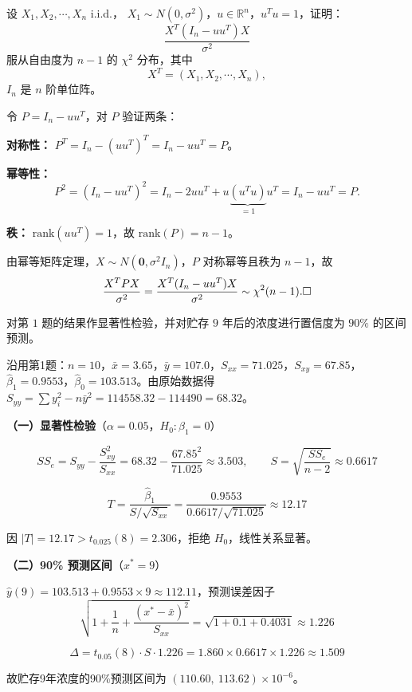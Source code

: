 \begin{homework}[5.2.2]
设 $X_1, X_2, \cdots, X_n$ i.i.d.，
$X_1 \sim N(0,\sigma^2)$，$u \in \mathbb{R}^n$，$u^T u = 1$，证明：
\[
\frac{X^T(I_n - uu^T)X}{\sigma^2}
\]
服从自由度为 $n-1$ 的 $\chi^2$ 分布，其中
\[
X^T = (X_1, X_2, \cdots, X_n),
\]
$I_n$ 是 $n$ 阶单位阵。
\end{homework}
\begin{solution}
令 $P = I_n - uu^T$，对 $P$ 验证两条：

\textbf{对称性：} $P^T = I_n - (uu^T)^T = I_n - uu^T = P$。

\textbf{幂等性：}
\[
P^2 = (I_n-uu^T)^2 = I_n - 2uu^T + u\underbrace{(u^Tu)}_{=1}u^T = I_n - uu^T = P.
\]

\textbf{秩：} $\mathrm{rank}(uu^T)=1$，故 $\mathrm{rank}(P)=n-1$。

由幂等矩阵定理，$X\sim N(\mathbf{0},\sigma^2 I_n)$，$P$ 对称幂等且秩为 $n-1$，故
\[
\frac{X^T P X}{\sigma^2} = \frac{X^T(I_n-uu^T)X}{\sigma^2}\sim\chi^2(n-1).\qed
\]
\end{solution}
\begin{homework}[6]
对第 $1$ 题的结果作显著性检验，并对贮存 $9$ 年后的浓度进行置信度为 $90\%$ 的区间预测。
\end{homework}
\begin{solution}
沿用第1题：$n=10$，$\bar x=3.65$，$\bar y=107.0$，$S_{xx}=71.025$，$S_{xy}=67.85$，
$\hat\beta_1=0.9553$，$\hat\beta_0=103.513$。由原始数据得
$S_{yy} = \sum y_i^2 - n\bar y^2 = 114558.32 - 114490 = 68.32$。

\textbf{（一）显著性检验}（$\alpha=0.05$，$H_0:\beta_1=0$）

$$SS_e = S_{yy} - \frac{S_{xy}^2}{S_{xx}} = 68.32 - \frac{67.85^2}{71.025} \approx 3.503,\qquad
S = \sqrt{\frac{SS_e}{n-2}} \approx 0.6617$$

$$T = \frac{\hat\beta_1}{S/\sqrt{S_{xx}}} = \frac{0.9553}{0.6617/\sqrt{71.025}} \approx 12.17$$

因 $|T|=12.17 > t_{0.025}(8)=2.306$，拒绝 $H_0$，线性关系显著。

\textbf{（二）90\% 预测区间}（$x^*=9$）

$\hat y(9)=103.513+0.9553\times9\approx112.11$，预测误差因子
$$\sqrt{1+\frac{1}{n}+\frac{(x^*-\bar x)^2}{S_{xx}}}=\sqrt{1+0.1+0.4031}\approx1.226$$

$$\Delta = t_{0.05}(8)\cdot S\cdot1.226 = 1.860\times0.6617\times1.226\approx1.509$$

故贮存9年浓度的90\%预测区间为 $(110.60,\ 113.62)\times10^{-6}$。
\end{solution}
